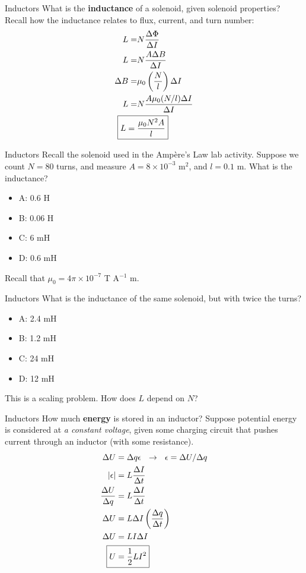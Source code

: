 \documentclass{beamer}
\begin{document}
\begin{frame}{Inductors}
What is the \textbf{\alert{inductance}} of a solenoid, given solenoid properties?  Recall how the inductance relates to flux, current, and turn number:
\begin{align}
L =& N \frac{\Delta \Phi}{\Delta I} \\
L =& N \frac{A \Delta B }{\Delta I} \\
\Delta B =& \mu_0 \left(\frac{N}{l}\right) \Delta I \\
L =& N\frac{A \mu_0 (N/l) \Delta I}{\Delta I} \\
\Aboxed{L =& \frac{\mu_0 N^2 A}{l}} \label{eq:solenoid_ind}
\end{align}
\end{frame}

\begin{frame}{Inductors}
Recall the solenoid used in the Amp\`{e}re's Law lab activity.  Suppose we count $N = 80$ turns, and measure $A = 8 \times 10^{-3}$ m$^2$, and $l = 0.1$ m.  What is the inductance?
\begin{itemize}
\item A: 0.6 H
\item B: 0.06 H
\item C: 6 mH 
\item D: 0.6 mH
\end{itemize}
\footnotesize
Recall that $\mu_0 = 4\pi \times 10^{-7}$ T A$^{-1}$ m.
\end{frame}

\begin{frame}{Inductors}
What is the inductance of the same solenoid, but with twice the turns?
\begin{itemize}
\item A: 2.4 mH
\item B: 1.2 mH
\item C: 24 mH 
\item D: 12 mH
\end{itemize}
\footnotesize
This is a scaling problem.  How does $L$ depend on $N$?
\end{frame}

\begin{frame}{Inductors}
\small
How much \textbf{\alert{energy}} is stored in an inductor?  Suppose potential energy is considered at \textit{a constant voltage}, given some charging circuit that pushes current through an inductor (with some resistance).
\begin{align}
\Delta U &= \Delta q \epsilon ~~ \rightarrow ~~ \epsilon = \Delta U/\Delta q \\
|\epsilon| &= L \frac{\Delta I}{\Delta t} \\
\frac{\Delta U}{\Delta q} &= L \frac{\Delta I}{\Delta t} \\
\Delta U &= L \Delta I \left( \frac{\Delta q}{\Delta t} \right) \\
\Delta U &= L I \Delta I \\
\Aboxed{ U &= \frac{1}{2} L I^2}
\end{align}
\end{frame}
\end{document}
